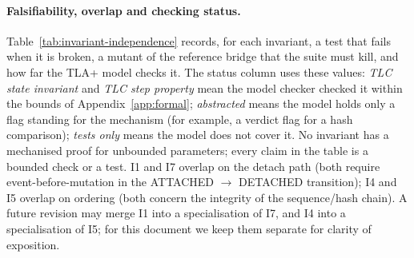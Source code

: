 \paragraph{Falsifiability, overlap and checking status.}
Table~\ref{tab:invariant-independence} records, for each invariant,
a test that fails when it is broken, a mutant of the reference bridge
that the suite must kill, and how far the TLA+ model checks it. The
status column uses these values: \emph{TLC state invariant} and \emph{TLC
step property} mean the model checker checked it within the bounds of
Appendix~\ref{app:formal}; \emph{abstracted} means the model holds only a
flag standing for the mechanism (for example, a verdict flag for a hash
comparison); \emph{tests only} means the model does not
cover it. No invariant has a mechanised proof for unbounded
parameters; every claim in the table is a bounded check or a test.
I1 and I7 overlap on the detach path (both require event-before-mutation
in the ATTACHED $\to$ DETACHED transition); I4 and I5 overlap on
ordering (both concern the integrity of the sequence/hash chain).
A future revision may merge I1 into a specialisation of I7, and I4
into a specialisation of I5; for this document we keep them separate
for clarity of exposition.

